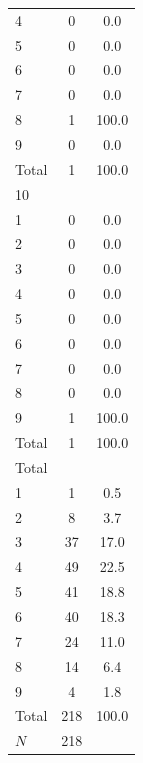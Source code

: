 {\begin{tabular}{l*{1}{cc}}
4           &           0&         0.0\\
5           &           0&         0.0\\
6           &           0&         0.0\\
7           &           0&         0.0\\
8           &           1&       100.0\\
9           &           0&         0.0\\
Total       &           1&       100.0\\
\hline
10          &            &            \\
1           &           0&         0.0\\
2           &           0&         0.0\\
3           &           0&         0.0\\
4           &           0&         0.0\\
5           &           0&         0.0\\
6           &           0&         0.0\\
7           &           0&         0.0\\
8           &           0&         0.0\\
9           &           1&       100.0\\
Total       &           1&       100.0\\
\hline
Total       &            &            \\
1           &           1&         0.5\\
2           &           8&         3.7\\
3           &          37&        17.0\\
4           &          49&        22.5\\
5           &          41&        18.8\\
6           &          40&        18.3\\
7           &          24&        11.0\\
8           &          14&         6.4\\
9           &           4&         1.8\\
Total       &         218&       100.0\\
\hline
\(N\)       &         218&            \\
\hline\hline
\end{tabular}
}
